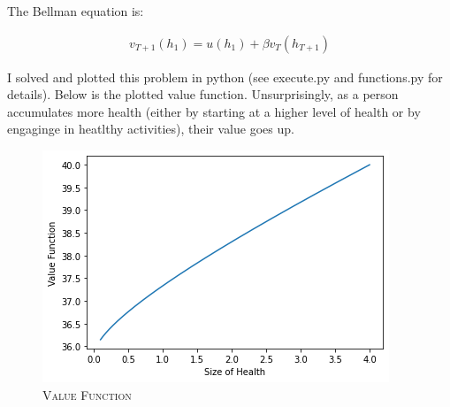 \documentclass{article}[12pt]
\begin{document}
The Bellman equation is:

\begin{equation}
\begin{aligned}
    \label{eq:bellman}
    v_{T+1}(h_1) = u(h_1) + \beta v_T (h_{T+1})
\end{aligned}
\end{equation}

\pagebreak

I solved and plotted this problem in python (see execute.py and functions.py for details).  Below is the plotted value function.  Unsurprisingly, as a person accumulates more health (either by starting at a higher level of health or by engaginge in heatlthy activities), their value goes up.

\begin{figure}[h]
    \centering
    \caption{\textsc{Value Function}}
    \label{fig:plot1}
    \includegraphics[scale=0.6]{plot1.png}
    \hspace{0.5cm}
\end{figure}
\end{document}
